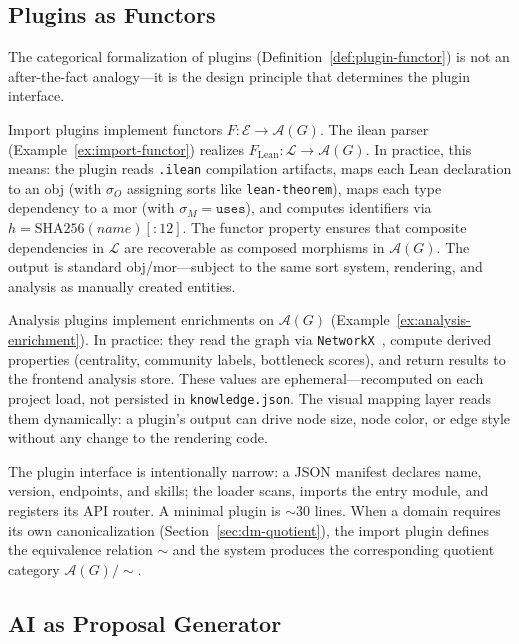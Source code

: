 \subsection{Plugins as Functors}
\label{sec:sys-plugins-functors}

The categorical formalization of plugins (Definition~\ref{def:plugin-functor}) is not an after-the-fact analogy---it is the design principle that determines the plugin interface.

Import plugins implement functors $F: \mathcal{E} \to \mathcal{A}(G)$. The ilean parser (Example~\ref{ex:import-functor}) realizes $F_{\mathrm{Lean}}: \mathcal{L} \to \mathcal{A}(G)$. In practice, this means: the plugin reads \texttt{.ilean} compilation artifacts, maps each Lean declaration to an obj (with $\sigma_O$ assigning sorts like \texttt{lean-theorem}), maps each type dependency to a mor (with $\sigma_M = \texttt{uses}$), and computes identifiers via $h = \mathrm{SHA256}(\textit{name})[:12]$. The functor property ensures that composite dependencies in $\mathcal{L}$ are recoverable as composed morphisms in $\mathcal{A}(G)$. The output is standard obj/mor---subject to the same sort system, rendering, and analysis as manually created entities.

Analysis plugins implement enrichments on $\mathcal{A}(G)$ (Example~\ref{ex:analysis-enrichment}). In practice: they read the graph via \texttt{NetworkX}~\cite{NetworkX}, compute derived properties (centrality, community labels, bottleneck scores), and return results to the frontend analysis store. These values are ephemeral---recomputed on each project load, not persisted in \texttt{knowledge.json}. The visual mapping layer reads them dynamically: a plugin's output can drive node size, node color, or edge style without any change to the rendering code.

The plugin interface is intentionally narrow: a JSON manifest declares name, version, endpoints, and skills; the loader scans, imports the entry module, and registers its API router. A minimal plugin is ${\sim}30$ lines. When a domain requires its own canonicalization (Section~\ref{sec:dm-quotient}), the import plugin defines the equivalence relation $\sim$ and the system produces the corresponding quotient category $\mathcal{A}(G)/{\sim}$.


\subsection{AI as Proposal Generator}
\label{sec:sys-ai}

